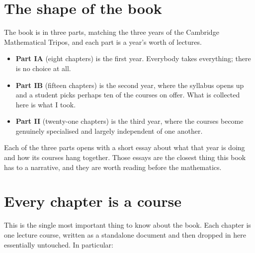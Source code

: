 

\section*{The shape of the book}

The book is in three parts, matching the three years of the Cambridge Mathematical
Tripos, and each part is a year's worth of lectures.

\begin{itemize}
	\item \textbf{Part IA} (eight chapters) is the first year. Everybody takes everything;
	there is no choice at all.
	\item \textbf{Part IB} (fifteen chapters) is the second year, where the syllabus opens
	up and a student picks perhaps ten of the courses on offer. What is collected here
	is what I took.
	\item \textbf{Part II} (twenty-one chapters) is the third year, where the courses
	become genuinely specialised and largely independent of one another.
\end{itemize}

Each of the three parts opens with a short essay about what that year is doing and how
its courses hang together. Those essays are the closest thing this book has to a
narrative, and they are worth reading before the mathematics.

\section*{Every chapter is a course}

This is the single most important thing to know about the book. Each chapter is one
lecture course, written as a standalone document and then dropped in here essentially
untouched. In particular:

